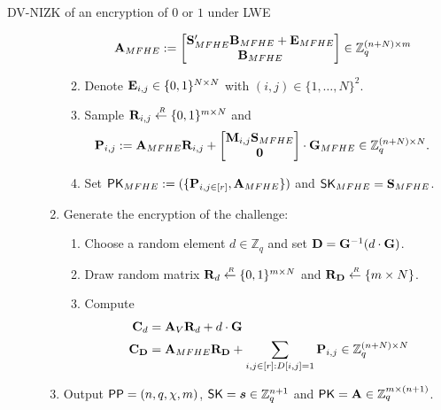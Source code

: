 \begin{subsection}{DV-NIZK of an encryption of $0$ or $1$ under LWE}
\begin{description}
\begin{enumerate}
\begin{enumerate}
\begin{align*}
            \mathbf{A}_{MFHE} &:= \begin{bmatrix}\mathbf{S}_{MFHE}'\mathbf{B}_{MFHE} + \mathbf{E}_{MFHE} \\ \mathbf{B}_{MFHE}\end{bmatrix} \in \mathbb{Z}_q^{(n+N) \times m}
          \end{align*}
        \item Denote $\mathbf{E}_{i,j} \in \{0, 1\}^{N\times N}$ with $(i,j) \in \{1, \dots ,N\}^2$.
        \item Sample $\mathbf{R}_{i,j} \stackrel{{\scriptscriptstyle \mkern4mu R}}{\gets} \{0,1\}^{m \times N}$ and
          \begin{align*}
            \mathbf{P}_{i,j} &:= \mathbf{A}_{MFHE} \mathbf{R}_{i,j} + \begin{bmatrix}\mathbf{M}_{i,j}\mathbf{S}_{MFHE}\\ \mathbf{0}\end{bmatrix}\cdot  \mathbf{G}_{MFHE} \in \mathbb{Z}_q^{(n+N) \times N}.
          \end{align*}
        \item Set $\mathsf{PK}_{MFHE} := (\{\mathbf{P}_{i,j \in [r]}, \mathbf{A}_{MFHE}\})$ and $\mathsf{SK}_{MFHE} = \mathbf{S}_{MFHE}$.
        \end{enumerate}
      \item Generate the encryption of the challenge:
        \begin{enumerate}
        \item Choose a random element $d \in \mathbb{Z}_{q}$ and set $\mathbf{D} = \mathbf{G}^{-1}(d \cdot \mathbf{G})$.
        \item Draw random matrix $\mathbf{R}_d \stackrel{{\scriptscriptstyle \mkern4mu R}}{\gets} \{0,1\}^{m \times N}$ and $\mathbf{R}_{\mathbf{D}} \stackrel{{\scriptscriptstyle \mkern4mu R}}{\gets} \{m \times N\}$.
        \item Compute
          \begin{align*}
            \mathbf{C}_d &= \mathbf{A}_V \mathbf{R}_d + d \cdot \mathbf{G}\\
            \mathbf{C}_{\mathbf{D}} &= \mathbf{A}_{MFHE} \mathbf{R}_{\mathbf{D}} + \sum_{i,j \in [r]: D[i,j] = 1} \mathbf{P}_{i,j} \in \mathbb{Z}_q^{(n+N) \times N}
          \end{align*}
        \end{enumerate}
      \item Output ${\mathsf{PP}} = (n, q, \chi, m)$, $\SK = \vec{s} \in \mathbb{Z}_q^{n+1}$ and $\mathsf{PK} = \mathbf{A} \in \mathbb{Z}_q^{m \times (n+1)}$.
      \end{enumerate}
 
 
 

\end{description}
\end{subsection}
